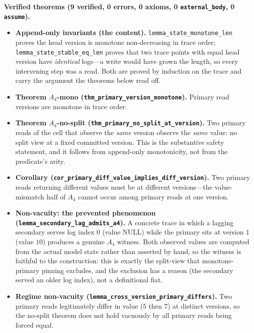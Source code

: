 \documentclass[journal,compsoc,10pt]{IEEEtran}
\theoremstyle{definition}
\theoremstyle{remark}
\begin{document}
\medskip
\noindent\textbf{Verified theorems (9 verified, 0 errors, 0 axioms, 0
\texttt{external\_body}, 0 \texttt{assume}).}
\begin{itemize}
  \item \textbf{Append-only invariants (the content).}
    \texttt{lemma\_state\_monotone\_len} proves the head version is monotone
    non-decreasing in trace order; \texttt{lemma\_state\_stable\_eq\_len}
    proves that two trace points with equal head version have
    \emph{identical} logs---a write would have grown the length, so every
    intervening step was a read. Both are proved by induction on the trace
    and carry the argument the theorems below read off.
  \item \textbf{Theorem $A_4$-mono
    (\texttt{thm\_primary\_\allowbreak version\_monotone}).}
    Primary read versions are monotone in trace order.
  \item \textbf{Theorem $A_4$-no-split
    (\texttt{thm\_primary\_\allowbreak no\_split\_at\_version}).}
    Two primary reads of the cell that observe the \emph{same} version
    observe the \emph{same} value: no split view at a fixed committed
    version. This is the substantive safety statement, and it follows from
    append-only monotonicity, not from the predicate's arity.
  \item \textbf{Corollary
    (\texttt{cor\_primary\_diff\_\allowbreak value\_implies\_\allowbreak diff\_version}).}
    Two primary reads returning different values must be at different
    versions---the value-mismatch half of $A_4$ cannot occur among primary
    reads at one version.
  \item \textbf{Non-vacuity: the prevented phenomenon
    (\texttt{lemma\_secondary\_lag\_admits\_a4}).}
    A concrete trace in which a lagging secondary serves log index $0$
    (value NULL) while the primary sits at version $1$ (value $10$) produces
    a genuine $A_4$ witness. Both observed values are computed from the actual
    model state rather than asserted by hand, so the witness is faithful to
    the construction: this is exactly the split-view that monotone-primary
    pinning excludes, and the exclusion has a reason (the secondary served an
    older log index), not a definitional fiat.
  \item \textbf{Regime non-vacuity
    (\texttt{lemma\_cross\_\allowbreak version\_primary\_differs}).}
    Two primary reads legitimately differ in value ($5$ then $7$) at distinct
    versions, so the no-split theorem does not hold vacuously by all primary
    reads being forced equal.
\end{itemize}
\end{document}
